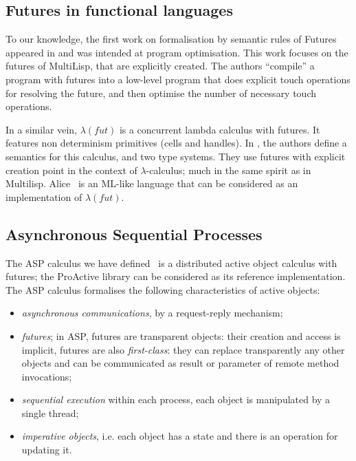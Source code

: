 \subsection{Futures in functional languages}
To our knowledge, the first work on formalisation by semantic rules of
Futures appeared in \cite{FlanaganFelleisen99,FlanaganFelleisen1995} and was intended at
program optimisation. This work focuses on the futures  of MultiLisp,
that are explicitly created. The authors ``compile'' a program with
futures into a low-level program that does explicit touch operations
for resolving the future, and then optimise the number of necessary touch operations.

In a similar vein,
$\lambda(fut)$ is a concurrent lambda calculus with futures.
It features non determinism primitives (cells and handles). In
\cite{jlambda-fut06}, the authors define a semantics for this calculus,
and two type systems. They use
futures with explicit creation point in the context of $\lambda$-calculus; much in
the same spirit as in Multilisp. Alice~\cite{Niehren:Sabel:Schmidt-Schauss:Schwinghammer:06} is an
ML-like language that can be considered as an implementation of
$\lambda(fut)$.



\subsection{Asynchronous Sequential Processes}
The ASP calculus we have defined~\cite{CH-book} is a distributed active object calculus with futures;  the
ProActive library \cite{CDD:CMST06} can be considered as its reference
implementation.  The ASP calculus formalises the
following characteristics of active objects:
\begin{itemize}
	\item \emph{asynchronous communications}, by a request-reply mechanism;
	\item \emph{futures}; in ASP, futures are transparent
	objects: their creation and access is implicit, futures are also
	\emph{first-class}: they can replace
	transparently any other objects and can be communicated as 
	result or parameter of remote method invocations;
	\item \emph{sequential execution} within each process, each object
	is manipulated by a single thread;
	\item \emph{imperative objects}, i.e. each object has a state and
	there is an operation for updating it.
\end{itemize}

